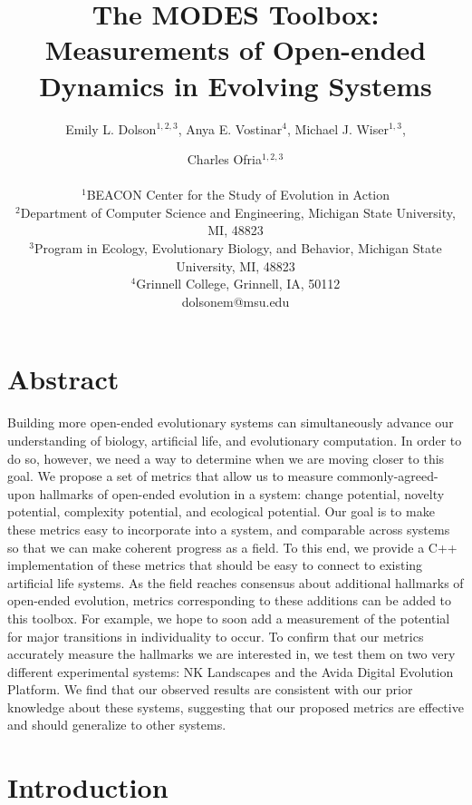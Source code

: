 \documentclass[letterpaper]{article}
\title{The MODES Toolbox: Measurements of Open-ended Dynamics in Evolving Systems}
\author{Emily L. Dolson$^{1,2,3}$, Anya E. Vostinar$^{4}$, Michael J. Wiser$^{1,3}$,\and Charles Ofria$^{1,2,3}$ \\
\mbox{}\\
$^1$BEACON Center for the Study of Evolution in Action  \\
$^2$Department of Computer Science and Engineering, Michigan State University, MI, 48823 \\
$^3$Program in Ecology, Evolutionary Biology, and Behavior, Michigan State University, MI, 48823 \\
$^4$Grinnell College, Grinnell, IA, 50112 \\
dolsonem@msu.edu}
\begin{document}
\maketitle

\section{Abstract}

Building more open-ended evolutionary systems can simultaneously advance our understanding of biology, artificial life, and evolutionary computation. In order to do so, however, we need a way to determine when we are moving closer to this goal. We propose a set of metrics that allow us to measure commonly-agreed-upon hallmarks of open-ended evolution in a system: change potential, novelty potential, complexity potential, and ecological potential. Our goal is to make these metrics easy to incorporate into a system, and comparable across systems so that we can make coherent progress as a field. To this end, we provide a C++ implementation of these metrics that should be easy to connect to existing artificial life systems. As the field reaches consensus about additional hallmarks of open-ended evolution, metrics corresponding to these additions can be added to this toolbox. For example, we hope to soon add a measurement of the potential for major transitions in individuality to occur. To confirm that our metrics accurately measure the hallmarks we are interested in, we test them on two very different experimental systems: NK Landscapes and the Avida Digital Evolution Platform. We find that our observed results are consistent with our prior knowledge about these systems, suggesting that our proposed metrics are effective and should generalize to other systems.

\section{Introduction}
\end{document}
